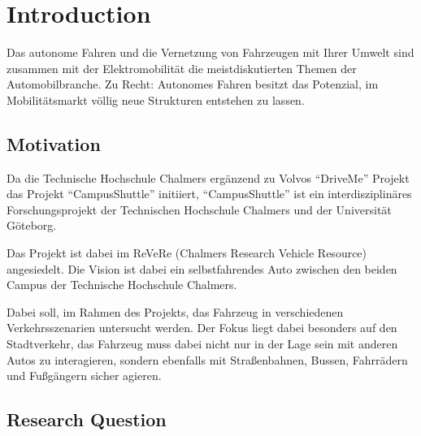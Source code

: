 \chapter{Introduction}

Das autonome Fahren und die Vernetzung von Fahrzeugen mit Ihrer Umwelt sind zusammen mit der Elektromobilität die meistdiskutierten Themen der Automobilbranche.
Zu Recht: Autonomes Fahren besitzt das Potenzial, im Mobilitätsmarkt völlig neue Strukturen entstehen zu lassen.

\section{Motivation}

Da die Technische Hochschule Chalmers ergänzend zu Volvos “DriveMe” Projekt das Projekt
“CampusShuttle” initiiert, “CampusShuttle” ist ein interdisziplinäres Forschungsprojekt
der Technischen Hochschule Chalmers und der Universität Göteborg.

Das Projekt ist dabei im ReVeRe (Chalmers Research Vehicle Resource) angesiedelt. Die Vision ist dabei ein selbstfahrendes
Auto zwischen den beiden Campus der Technische Hochschule Chalmers.

Dabei soll, im Rahmen des Projekts, das Fahrzeug in verschiedenen Verkehrsszenarien untersucht
werden. Der Fokus liegt dabei besonders auf den Stadtverkehr, das Fahrzeug muss dabei nicht
nur in der Lage sein mit anderen Autos zu interagieren, sondern ebenfalls mit Straßenbahnen,
Bussen, Fahrrädern und Fußgängern sicher agieren. 

\section{Research Question}